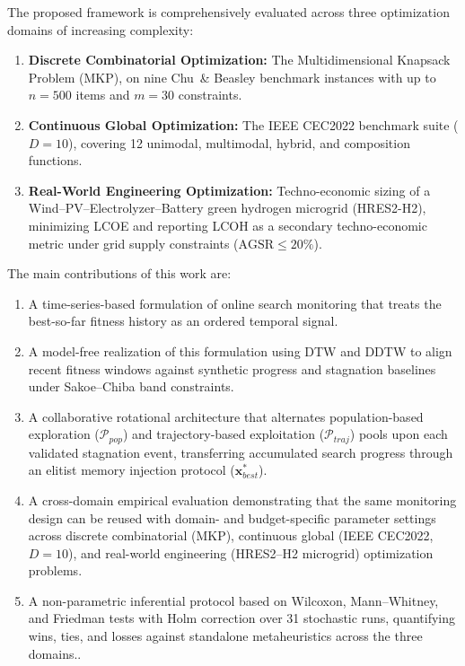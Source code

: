 \documentclass[review]{elsarticle}
\begin{document}
The proposed framework is comprehensively evaluated across three optimization domains of increasing complexity:
\begin{enumerate}
    \item \textbf{Discrete Combinatorial Optimization:} The Multidimensional Knapsack Problem (MKP), on nine Chu~\& Beasley benchmark instances with up to $n = 500$ items and $m = 30$ constraints.
    \item \textbf{Continuous Global Optimization:} The IEEE CEC2022 benchmark suite ($D = 10$), covering 12 unimodal, multimodal, hybrid, and composition functions.
    \item \textbf{Real-World Engineering Optimization:} Techno-economic sizing of a Wind--PV--Electrolyzer--Battery green hydrogen microgrid (HRES2-H2), minimizing LCOE and reporting LCOH as a secondary techno-economic metric under grid supply constraints ($\text{AGSR} \le 20\%$).
\end{enumerate}
The main contributions of this work are:
\begin{enumerate}
     \item A time-series-based formulation of online search monitoring that
          treats the best-so-far fitness history as an ordered temporal
          signal. 
    \item A model-free realization of this formulation using DTW and DDTW
          to align recent fitness windows against synthetic progress and
          stagnation baselines under Sakoe--Chiba band constraints.
   \item A collaborative rotational architecture that alternates
          population-based exploration ($\mathcal{P}_{pop}$) and
          trajectory-based exploitation ($\mathcal{P}_{traj}$) pools upon
          each validated stagnation event, transferring accumulated search
          progress through an elitist memory injection protocol
          ($\mathbf{x}_{best}^*$).
    \item A cross-domain empirical evaluation demonstrating that the same
          monitoring design can be reused with domain- and budget-specific parameter settings
          across discrete combinatorial (MKP), continuous global (IEEE
          CEC2022, $D=10$), and real-world engineering (HRES2--H2 microgrid)
          optimization problems.
    \item A non-parametric inferential protocol based on Wilcoxon,
      Mann--Whitney, and Friedman tests with Holm correction over
      31 stochastic runs, quantifying wins, ties, and losses against
      standalone metaheuristics across the three domains..
          
\end{enumerate}
\end{document}
